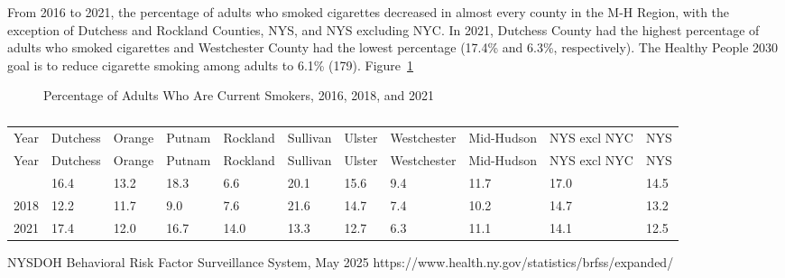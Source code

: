 \documentclass[
  english,
  letterpaper,
]{report}
\begin{document}
From 2016 to 2021, the percentage of adults who smoked cigarettes
decreased in almost every county in the M-H Region, with the exception
of Dutchess and Rockland Counties, NYS, and NYS excluding NYC. In 2021,
Dutchess County had the highest percentage of adults who smoked
cigarettes and Westchester County had the lowest percentage (17.4\% and
6.3\%, respectively). The Healthy People 2030 goal is to reduce
cigarette smoking among adults to 6.1\% (179).
Figure~\ref{fig-adult-currsmoke-percent}

\begin{figure}


\caption{\label{fig-adult-currsmoke-percent}Percentage of Adults Who Are
Current Smokers, 2016, 2018, and 2021}

\end{figure}%

\begin{longtable}[]{@{}lllllllllll@{}}

\caption{\label{tbl-adult-currsmoke-percent}Percentage of Adults Who Are
Current Smokers, 2016, 2018, and 2021}

\tabularnewline

\caption{}\label{T_410b1}\tabularnewline
\toprule\noalign{}
Year & Dutchess & Orange & Putnam & Rockland & Sullivan & Ulster &
Westchester & Mid-Hudson & NYS excl NYC & NYS \\
\midrule\noalign{}
\endfirsthead
\toprule\noalign{}
Year & Dutchess & Orange & Putnam & Rockland & Sullivan & Ulster &
Westchester & Mid-Hudson & NYS excl NYC & NYS \\
\midrule\noalign{}
\endhead
\bottomrule\noalign{}
\endlastfoot
2016 & 16.4 & 13.2 & 18.3 & 6.6 & 20.1 & 15.6 & 9.4 & 11.7 & 17.0 &
14.5 \\
2018 & 12.2 & 11.7 & 9.0 & 7.6 & 21.6 & 14.7 & 7.4 & 10.2 & 14.7 &
13.2 \\
2021 & 17.4 & 12.0 & 16.7 & 14.0 & 13.3 & 12.7 & 6.3 & 11.1 & 14.1 &
12.5 \\

\end{longtable}

\begin{tcolorbox}[enhanced jigsaw, breakable, leftrule=.75mm, title=\textcolor{quarto-callout-note-color}{\faInfo}\hspace{0.5em}{Source}, bottomrule=.15mm, opacityback=0, left=2mm, colback=white, bottomtitle=1mm, coltitle=black, colbacktitle=quarto-callout-note-color!10!white, colframe=quarto-callout-note-color-frame, opacitybacktitle=0.6, toptitle=1mm, titlerule=0mm, arc=.35mm, rightrule=.15mm, toprule=.15mm]

NYSDOH Behavioral Risk Factor Surveillance System, May 2025
https://www.health.ny.gov/statistics/brfss/expanded/

\end{tcolorbox}
\end{document}

